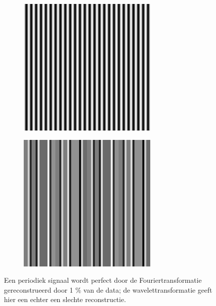 \begin{figure}[h]
  \centering
  \begin{subfigure}[b]{0.25\textwidth}
    \centering
    \includegraphics[width=\textwidth]{plaatjes/sin_fourier.png}
  \end{subfigure}
  \begin{subfigure}[b]{0.25\textwidth}
    \centering
    \includegraphics[width=\textwidth]{plaatjes/sin.png}
  \end{subfigure}
  \caption{Een periodiek signaal wordt perfect door de Fouriertransformatie gereconstrueerd door 1 \% van de data; de wavelettransformatie geeft hier een
echter een slechte reconstructie.}
  \label{fig:sinus_fig}
\end{figure}


